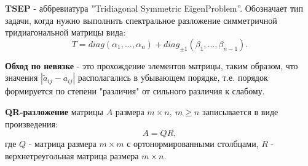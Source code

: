 \textbf{TSEP} - аббревиатура ''Tridiagonal Symmetric EigenProblem''. Обозначает тип задачи, когда нужно выполнить спектральное разложение симметричной тридиагональной матрицы вида:
\[
        T= diag(\alpha_1,\dots,\alpha_n)+diag_{\pm1}(\beta_1,\dots,\beta_{n-1}).
\]
% 

\textbf{Обход по невязке} - это прохождение элементов матрицы, таким образом, что значения \(|\tilde{a}_{ij} - a_{ij}|\) располагались в убывающем порядке, т.е.  порядок формируется по степени "различия"\(\) от сильного различия к слабому.

\textbf{QR-разложение} матрицы \(A\) размера \(m\times n,\ m\ge n  \) записывается в виде произведения:  \[A = QR,\] где \(Q\) - матрица размера \(m \times m\) с ортонормированными столбцами, \(R\) - верхнетреугольная матрица размера \(m \times n\).